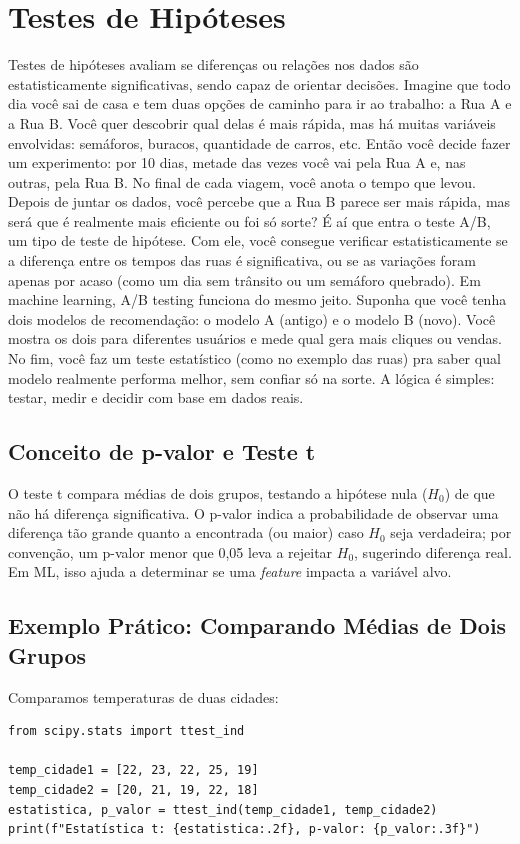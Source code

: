 \documentclass[a4paper,12pt,openany]{book}
\begin{document}
\section{Testes de Hipóteses}
Testes de hipóteses avaliam se diferenças ou relações nos dados são estatisticamente significativas, sendo capaz de orientar decisões.
Imagine que todo dia você sai de casa e tem duas opções de caminho para ir ao trabalho: a Rua A e a Rua B. Você quer descobrir qual delas é mais rápida, mas há muitas variáveis envolvidas: semáforos, buracos, quantidade de carros, etc.
Então você decide fazer um experimento: por 10 dias, metade das vezes você vai pela Rua A e, nas outras, pela Rua B. No final de cada viagem, você anota o tempo que levou.
Depois de juntar os dados, você percebe que a Rua B parece ser mais rápida, mas será que é realmente mais eficiente ou foi só sorte? É aí que entra o teste A/B, um tipo de teste de hipótese.
Com ele, você consegue verificar estatisticamente se a diferença entre os tempos das ruas é significativa, ou se as variações foram apenas por acaso (como um dia sem trânsito ou um semáforo quebrado).
Em machine learning, A/B testing funciona do mesmo jeito. Suponha que você tenha dois modelos de recomendação: o modelo A (antigo) e o modelo B (novo). Você mostra os dois para diferentes usuários e mede qual gera mais cliques ou vendas. No fim, você faz um teste estatístico (como no exemplo das ruas) pra saber qual modelo realmente performa melhor, sem confiar só na sorte.
A lógica é simples: testar, medir e decidir com base em dados reais.

\subsection{Conceito de p-valor e Teste t}
O teste t compara médias de dois grupos, testando a hipótese nula ($H_0$) de que não há diferença significativa. O p-valor indica a probabilidade de observar uma diferença tão grande quanto a encontrada (ou maior) caso $H_0$ seja verdadeira; por convenção, um p-valor menor que 0,05 leva a rejeitar $H_0$, sugerindo diferença real. Em ML, isso ajuda a determinar se uma \textit{feature} impacta a variável alvo.

\subsection{Exemplo Prático: Comparando Médias de Dois Grupos}
Comparamos temperaturas de duas cidades:

\begin{verbatim}
from scipy.stats import ttest_ind

temp_cidade1 = [22, 23, 22, 25, 19]
temp_cidade2 = [20, 21, 19, 22, 18]
estatistica, p_valor = ttest_ind(temp_cidade1, temp_cidade2)
print(f"Estatística t: {estatistica:.2f}, p-valor: {p_valor:.3f}")
\end{verbatim}
\end{document}
